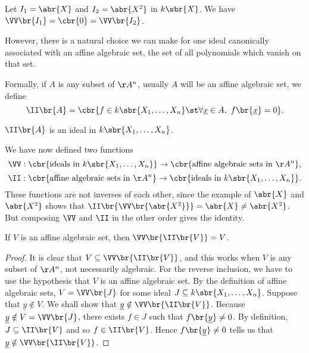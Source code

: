 \begin{example*}
Let $ I_1 = \abr{X} $ and $ I_2 = \abr{X^2} $ in $ k\sbr{X} $. We have $ \VV\br{I_1} = \cbr{0} = \VV\br{I_2} $.
\end{example*}

However, there is a natural choice we can make for one ideal canonically associated with an affine algebraic set, the set of all polynomials which vanish on that set.

\begin{definition*}
Formally, if $ A $ is any subset of $ \AA^n $, usually $ A $ will be an affine algebraic set, we define
$$ \II\br{A} = \cbr{f \in k\sbr{X_1, \dots, X_n} \st \forall \underline{x} \in A, \ f\br{\underline{x}} = 0}. $$
\end{definition*}

\begin{note*}
$ \II\br{A} $ is an ideal in $ k\sbr{X_1, \dots, X_n} $.
\end{note*}

We have now defined two functions
$$ \VV : \cbr{\text{ideals in} \ k\sbr{X_1, \dots, X_n}} \to \cbr{\text{affine algebraic sets in} \ \AA^n}, $$
$$ \II : \cbr{\text{affine algebraic sets in} \ \AA^n} \to \cbr{\text{ideals in} \ k\sbr{X_1, \dots, X_n}}. $$
These functions are not inverses of each other, since the example of $ \abr{X} $ and $ \abr{X^2} $ shows that $ \II\br{\VV\br{\abr{X^2}}} = \abr{X} \ne \abr{X^2} $. But composing $ \VV $ and $ \II $ in the other order gives the identity.

\begin{lemma}
\label{lem:viv}
If $ V $ is an affine algebraic set, then $ \VV\br{\II\br{V}} = V $.
\end{lemma}

\begin{proof}
It is clear that $ V \subseteq \VV\br{\II\br{V}} $, and this works when $ V $ is any subset of $ \AA^n $, not necessarily algebraic. For the reverse inclusion, we have to use the hypothesis that $ V $ is an affine algebraic set. By the definition of affine algebraic sets, $ V = \VV\br{J} $ for some ideal $ J \subseteq k\sbr{X_1, \dots, X_n} $. Suppose that $ \underline{y} \notin V $. We shall show that $ \underline{y} \notin \VV\br{\II\br{V}} $. Because $ \underline{y} \notin V = \VV\br{J} $, there exists $ f \in J $ such that $ f\br{\underline{y}} \ne 0 $. By definition, $ J \subseteq \II\br{V} $ and so $ f \in \II\br{V} $. Hence $ f\br{\underline{y}} \ne 0 $ tells us that $ \underline{y} \notin \VV\br{\II\br{V}} $.
\end{proof}

